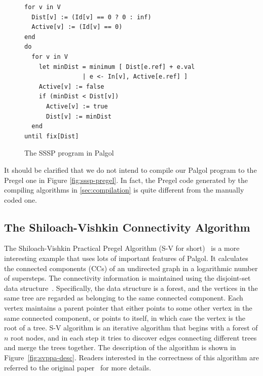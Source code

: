 \documentclass{sokendai_thesis} %
\begin{document}
\begin{figure}[thp]
\begin{lstlisting}[basicstyle=\small\ttfamily]
for v in V
  Dist[v] := (Id[v] == 0 ? 0 : inf)
  Active[v] := (Id[v] == 0)
end
do
  for v in V
    let minDist = minimum [ Dist[e.ref] + e.val
                | e <- In[v], Active[e.ref] ]
    Active[v] := false
    if (minDist < Dist[v])
      Active[v] := true
      Dist[v] := minDist
  end
until fix[Dist]
\end{lstlisting}
\vspace{-2ex}
\caption{The SSSP program in Palgol}
\label{fig:sssp-palgol}
\end{figure}


It should be clarified that we do not intend to compile our Palgol program to the Pregel one in Figure \ref{fig:sssp-pregel}.
In fact, the Pregel code generated by the compiling algorithms in \autoref{sec:compilation} is quite different from the manually coded one.

\subsection{The Shiloach-Vishkin Connectivity Algorithm}
\label{sec:svppa}

The Shiloach-Vishkin Practical Pregel Algorithm (S-V for short)~\cite{connectivity} is a more interesting example that uses lots of important features of Palgol.
It calculates the connected components (CCs) of an undirected graph in a logarithmic 
number of supersteps.
The connectivity information is maintained using the disjoint-set data structure~\cite{disjointset}.
Specifically, the data structure is a forest, and the vertices in the same tree are regarded as belonging to the same connected component.
Each vertex maintains a parent pointer that either points to some other vertex in the same connected component, or points to itself, in which case the vertex is the root of a tree.
S-V algorithm is an iterative algorithm that begins with a forest of $n$ root nodes, and in each step it tries to discover edges connecting different trees and merge the trees together.
The description of the algorithm is shown in Figure~\ref{fig:svppa-desc}.
Readers interested in the correctness of this algorithm are referred to the original paper~\cite{connectivity} for more details.
\end{document}

